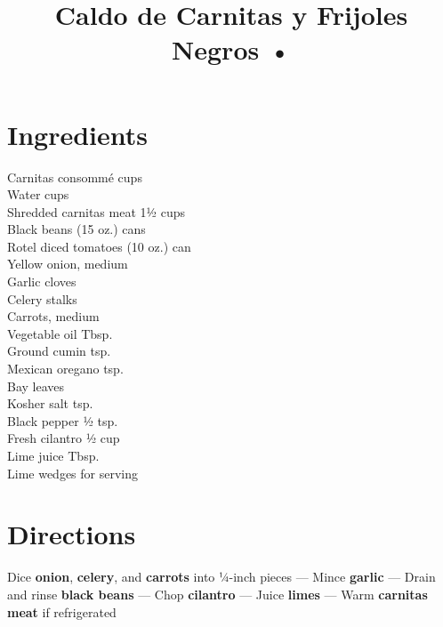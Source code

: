\documentclass[11pt,letterpaper]{article}
\title{Caldo de Carnitas y Frijoles Negros •}
\author{}
\date{}
\begin{document}
\maketitle
\thispagestyle{empty}

\section*{Ingredients}
\setlength{\columnsep}{20pt}
\begin{multicols}{2}
\noindent
    Carnitas consommé  cups \\
    Water  cups \\
    Shredded carnitas meat \dotfill 1½ cups \\
    Black beans  (15 oz.) cans \\
    Rotel diced tomatoes  (10 oz.) can \\
    Yellow onion, medium  \\
    Garlic cloves  \\
    Celery stalks  \\
    Carrots, medium  \\
    \columnbreak
    Vegetable oil  Tbsp. \\
    Ground cumin  tsp. \\
    Mexican oregano  tsp. \\
    Bay leaves  \\
    Kosher salt  tsp. \\
    Black pepper \dotfill ½ tsp. \\
    Fresh cilantro \dotfill ½ cup \\
    Lime juice  Tbsp. \\
    Lime wedges \dotfill for serving \\
\end{multicols}

\section*{Directions}

\noindent
Dice \textbf{onion}, \textbf{celery}, and \textbf{carrots} into ¼-inch pieces ---
Mince \textbf{garlic} ---
Drain and rinse \textbf{black beans} ---
Chop \textbf{cilantro} ---
Juice \textbf{limes} ---
Warm \textbf{carnitas meat} if refrigerated
\end{document}
